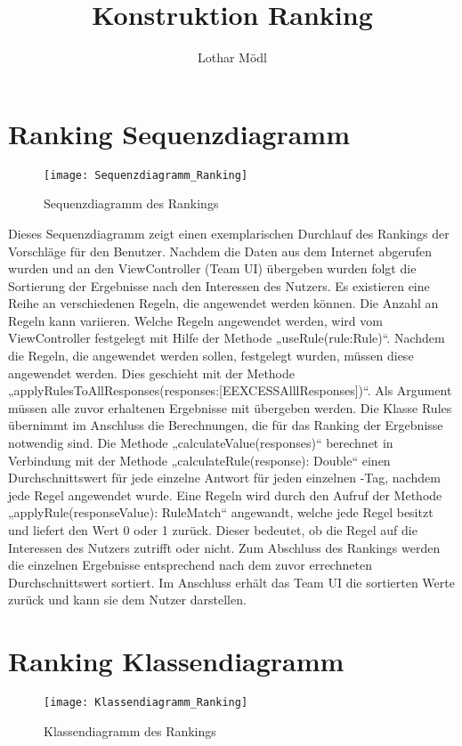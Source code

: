 
\title{Konstruktion Ranking}
\author{Lothar Mödl}

\section{Ranking Sequenzdiagramm}

\begin{figure}[h]
	\centering
	\texttt{[image: Sequenzdiagramm\_Ranking]}
	\caption{Sequenzdiagramm des Rankings}
	\label{fig:Ranking Sequenzdiagramm}
\end{figure}

Dieses Sequenzdiagramm zeigt einen exemplarischen Durchlauf des Rankings der Vorschläge für den Benutzer. Nachdem die Daten aus dem Internet abgerufen wurden und an den ViewController (Team UI) übergeben wurden folgt die Sortierung der Ergebnisse nach den Interessen des Nutzers. Es existieren eine Reihe an verschiedenen Regeln, die angewendet werden können. Die Anzahl an Regeln kann variieren. Welche Regeln angewendet werden, wird vom ViewController festgelegt mit Hilfe der Methode „useRule(rule:Rule)“. Nachdem die Regeln, die angewendet werden sollen, festgelegt wurden, müssen diese angewendet werden. Dies geschieht mit der Methode „applyRulesToAllResponses(responses:[EEXCESSAlllResponses])“. Als Argument müssen alle zuvor erhaltenen Ergebnisse mit übergeben werden. Die Klasse Rules übernimmt im Anschluss die Berechnungen, die für das Ranking der Ergebnisse notwendig sind. Die Methode „calculateValue(responses)“ berechnet in Verbindung mit der Methode „calculateRule(response): Double“ einen Durchschnittswert für jede einzelne Antwort für jeden einzelnen \SEARCH-Tag, nachdem jede Regel angewendet wurde. Eine Regeln wird durch den Aufruf der Methode „applyRule(responseValue): RuleMatch“ angewandt, welche jede Regel besitzt und liefert den Wert 0 oder 1 zurück. Dieser bedeutet, ob die Regel auf die Interessen des Nutzers zutrifft oder nicht. Zum Abschluss des Rankings werden die einzelnen Ergebnisse entsprechend nach dem zuvor errechneten Durchschnittswert sortiert. Im Anschluss erhält das Team UI die sortierten Werte zurück und kann sie dem Nutzer darstellen. 

\section{Ranking Klassendiagramm}

\begin{figure}[h]
	\centering
	\texttt{[image: Klassendiagramm\_Ranking]}
	\caption{Klassendiagramm des Rankings}
	\label{fig:Ranking Klassendiagramm}
\end{figure}

